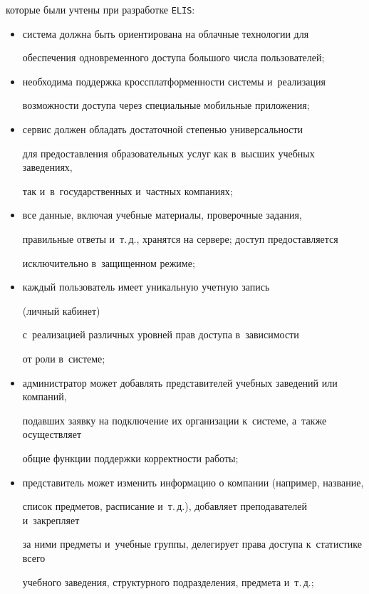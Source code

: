 которые были учтены при разработке \verb"ELIS":


\begin{itemize}


\item система должна быть ориентирована на облачные технологии для 


обеспечения одновременного доступа большого числа пользователей;


\item необходима поддержка кроссплатформенности системы и~реализация 


возможности доступа через специальные мобильные приложения;


\item сервис должен обладать достаточной степенью универсальности 


для предоставления образовательных услуг как в~высших учебных заведениях, 


так и~в~государственных и~частных компаниях;


\item все данные, включая учебные материалы, проверочные задания, 


правильные ответы и~т.\,д., хранятся на сервере; доступ предоставляется 


исключительно в~защищенном режиме;


\item каждый пользователь имеет уникальную учетную запись %


(личный кабинет) 


с~реализацией различных уровней прав доступа в~зависимости 


от роли в~системе;


\item администратор может добавлять представителей учебных заведений или компаний, 


подавших заявку на подключение их организации к~системе, а~также осуществляет 


общие функции поддержки корректности работы;


\item представитель может изменить информацию о компании (например, название, 


список предметов, расписание и~т.\,д.), добавляет преподавателей и~закрепляет 


за ними предметы и~учебные группы, делегирует права доступа к~статистике всего 


учебного заведения, структурного подразделения, предмета и~т.\,д.;



\end{itemize}
